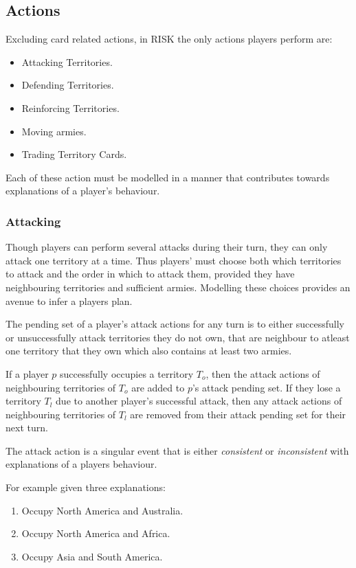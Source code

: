 \documentclass[parskip]{cs4rep}
\begin{document}
\subsection{Actions}

Excluding card related actions, in RISK the only actions players perform are:

\begin{itemize}
\item
Attacking Territories.
\item
Defending Territories.
\item
Reinforcing Territories.
\item
Moving armies.
\item
Trading Territory Cards.
\end{itemize}

Each of these action must be modelled in a manner that contributes towards explanations of a player's behaviour.

\subsubsection{Attacking}

Though players can perform several attacks during their turn, they can only attack one territory at a time. Thus players' must choose both which territories to attack and the order in which to attack them, provided they have neighbouring territories and sufficient armies. Modelling these choices provides an avenue to infer a players plan.

The pending set of a player's attack actions for any turn is to either successfully or unsuccessfully attack territories they do not own, that are neighbour to atleast one territory that they own which also contains at least two armies.

If a player $p$ successfully occupies a territory $T_{o}$, then the attack actions of neighbouring territories of $T_{o}$ are added to $p$'s attack pending set. If they lose a territory $T_{l}$ due to another player's successful attack, then any attack actions of neighbouring territories of $T_{l}$ are removed from their attack pending set for their next turn. 

The attack action is a singular event that is either \textit{consistent} or \textit{inconsistent} with explanations of a players behaviour. 

For example given three explanations:

\begin{enumerate}
\item
Occupy North America and Australia.
\item
Occupy North America and Africa.
\item
Occupy Asia and South America.
\end{enumerate}
\end{document}
